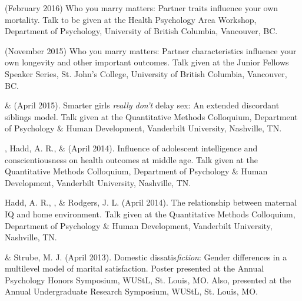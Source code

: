 \item \meb (February 2016) Who you marry matters: Partner traits influence your own mortality. Talk to be given at the Health Psychology Area Workshop, Department of Psychology, University of British Columbia, Vancouver, BC.
\item \meb (November 2015) Who you marry matters: Partner characteristics influence your own longevity and other important outcomes. Talk given at the Junior Fellows Speaker Series, St. John's College, University of British Columbia, Vancouver, BC.
\item\meb \& \Joe (April 2015). Smarter girls \textit{really don't} delay sex: An extended discordant siblings model. Talk given at the Quantitative Methods Colloquium, Department of Psychology \& Human Development, Vanderbilt University, Nashville, TN.
\item\meb, Hadd, A. R., \& \Joe (April 2014). Influence of adolescent intelligence and conscientiousness on health outcomes at middle age. Talk given at the Quantitative Methods Colloquium, Department of Psychology \& Human Development, Vanderbilt University, Nashville, TN.
\item Hadd, A. R., \meb, \& Rodgers, J. L. (April 2014). The relationship between maternal IQ and home environment. Talk given at the Quantitative Methods Colloquium, Department of Psychology \& Human Development, Vanderbilt University, Nashville, TN.
\item\meb \& Strube, M. J. (April 2013). Domestic dissatis{\em fiction}: Gender differences in a multilevel model of marital satisfaction. Poster presented at the Annual Psychology Honors Symposium, WUStL, St. Louis, MO. Also, presented at the Annual Undergraduate Research Symposium, WUStL, St. Louis, MO.